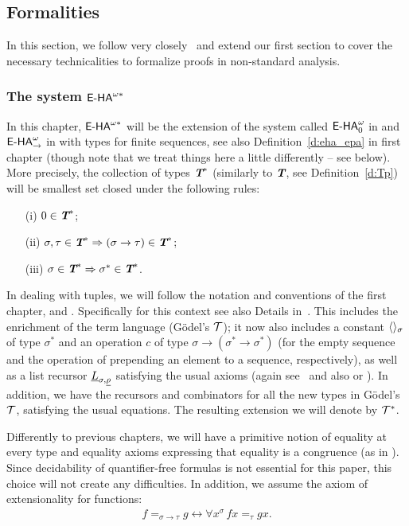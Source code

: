 \subsection{Formalities}

In this section, we follow very closely~\cite{BBS12} and extend our first section to cover the necessary
technicalities to formalize proofs in non-standard analysis.

\subsubsection*{The system ${\textsf{\upshape E-HA}}^{\omega*}$}

In this chapter, ${\textsf{\upshape E-HA}}^{\omega*}$ will be the extension of the system called ${\textsf{\upshape E-HA}}^{\omega}_0$ in \cite{Troelstra73} and ${\textsf{\upshape E-HA}}_{\to}^\omega$ in \cite{troelstravandalen88b} with types for finite sequences, see also Definition~\ref{d:eha_epa} in first chapter (though note that we treat things here a little differently -- see below). More precisely, the collection of types $\emph{\protect\textbf{T}}^*$ 
(similarly to $\emph{\protect\textbf{T}}$, see Definition~\ref{d:Tp}) will be smallest set closed under the following rules:
\begin{enumerate}
\item[(i)] $0 \in \emph{\protect\textbf{T}}^*$;
\item[(ii)] $\sigma, \tau \in \emph{\protect\textbf{T}}^* \Rightarrow (\sigma \to \tau) \in \emph{\protect\textbf{T}}^*$;
\item[(iii)] $\sigma \in \emph{\protect\textbf{T}}^* \Rightarrow \sigma^* \in \emph{\protect\textbf{T}}^*$.
\end{enumerate}

In dealing with tuples, we will follow the notation and conventions of the first chapter, \cite{Troelstra73} and \cite{Kohlenbach08}. Specifically 
for this context see also Details in~\cite{BBS12}. This includes the enrichment of the term language (G\"odel's $\mathcal{T}$); it now also includes a constant $\langle\rangle_\sigma$ of type $\sigma^*$ and an operation $c$ of type $\sigma \to (\sigma^* \to \sigma^*)$ (for the empty sequence and the operation of prepending an element to a sequence, respectively), as well as a list recursor $\underline L_{\sigma, \underline \rho}$ satisfying the usual axioms (again see~\cite{BBS12} and also
\cite[p. 456]{troelstravandalen88b} or \cite[p. 48]{Kohlenbach08}). In addition, we have the recursors and combinators for all the new types in G\"odel's $\mathcal{T}$, satisfying the usual equations.  The resulting extension we will denote by $\mathcal{T}^*$.

Differently to previous chapters, we will have a primitive notion of equality at every type and equality axioms expressing that equality is a congruence (as in \cite[p. 448-9]{troelstravandalen88b}). Since decidability of quantifier-free formulas is not essential for this paper, this choice will not create any difficulties. In addition, we assume the axiom of extensionality for functions:
\begin{displaymath}
\begin{array}{l}
f =_{\sigma \to \tau} g \leftrightarrow \forall x^\sigma \, fx =_{\tau} gx.
\end{array}
\end{displaymath}

